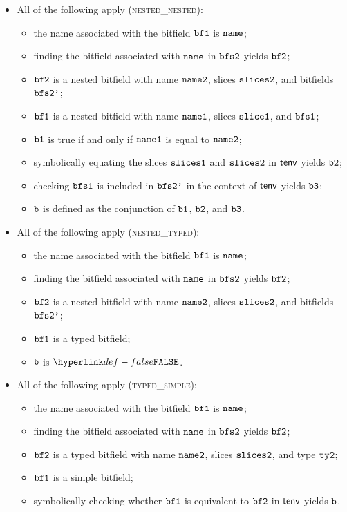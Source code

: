 \documentclass{book}
\begin{document}
\begin{itemize}
  \item All of the following apply (\textsc{nested\_nested}):
  \begin{itemize}
    \item the name associated with the bitfield $\texttt{bf1}$ is $\texttt{name}$;
    \item finding the bitfield associated with $\texttt{name}$ in $\texttt{bfs2}$ yields $\texttt{bf2}$;
    \item $\texttt{bf2}$ is a nested bitfield with name $\texttt{name2}$, slices $\texttt{slices2}$, and bitfields $\texttt{bfs2'}$;
    \item $\texttt{bf1}$ is a nested bitfield with name $\texttt{name1}$, slices $\texttt{slice1}$, and $\texttt{bfs1}$;
    \item $\texttt{b1}$ is true if and only if $\texttt{name1}$ is equal to $\texttt{name2}$;
    \item symbolically equating the slices $\texttt{slices1}$ and $\texttt{slices2}$ in $\textsf{tenv}$ yields $\texttt{b2}$;
    \item checking $\texttt{bfs1}$ is included in $\texttt{bfs2'}$ in the context of $\textsf{tenv}$ yields $\texttt{b3}$;
    \item $\texttt{b}$ is defined as the conjunction of $\texttt{b1}$, $\texttt{b2}$, and $\texttt{b3}$.
  \end{itemize}

  \item All of the following apply (\textsc{nested\_typed}):
  \begin{itemize}
    \item the name associated with the bitfield $\texttt{bf1}$ is $\texttt{name}$;
    \item finding the bitfield associated with $\texttt{name}$ in $\texttt{bfs2}$ yields $\texttt{bf2}$;
    \item $\texttt{bf2}$ is a nested bitfield with name $\texttt{name2}$, slices $\texttt{slices2}$, and bitfields $\texttt{bfs2'}$;
    \item $\texttt{bf1}$ is a typed bitfield;
    \item $\texttt{b}$ is $\False$.
  \end{itemize}

  \item All of the following apply (\textsc{typed\_simple}):
  \begin{itemize}
    \item the name associated with the bitfield $\texttt{bf1}$ is $\texttt{name}$;
    \item finding the bitfield associated with $\texttt{name}$ in $\texttt{bfs2}$ yields $\texttt{bf2}$;
    \item $\texttt{bf2}$ is a typed bitfield with name $\texttt{name2}$, slices $\texttt{slices2}$, and type $\texttt{ty2}$;
    \item $\texttt{bf1}$ is a simple bitfield;
    \item symbolically checking whether $\texttt{bf1}$ is equivalent to $\texttt{bf2}$ in $\textsf{tenv}$ yields $\texttt{b}$.
  \end{itemize}


\end{itemize}
\end{document}
